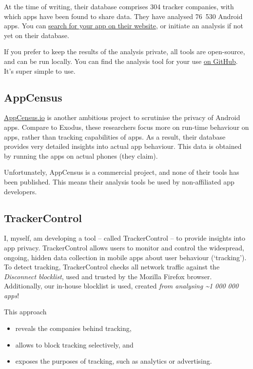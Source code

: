 \documentclass[
]{book}
\providecommand{\tightlist}{%
  \setlength{\itemsep}{0pt}\setlength{\parskip}{0pt}}
\begin{document}
At the time of writing, their database comprises 304 tracker companies, with which apps have been found to share data. They have analysed 76~530 Android apps. You can \href{https://reports.exodus-privacy.eu.org/en/reports/}{search for your app on their website}, or initiate an analysis if not yet on their database.

If you prefer to keep the results of the analysis private, all tools are open-source, and can be run locally. You can find the analysis tool for your use \href{https://github.com/Exodus-Privacy/exodus-standalone}{on GitHub}. It's super simple to use.

\hypertarget{appcensus}{%
\subsection{AppCensus}\label{appcensus}}

\href{https://search.appcensus.io/}{AppCensus.io} is another ambitious project to scrutinise the privacy of Android apps. Compare to Exodus, these researchers focus more on run-time behaviour on apps, rather than tracking capabilities of apps. As a result, their database provides very detailed insights into actual app behaviour. This data is obtained by running the apps on actual phones (they claim).

Unfortunately, AppCensus is a commercial project, and none of their tools has been published. This means their analysis tools be used by non-affiliated app developers.

\hypertarget{trackercontrol}{%
\subsection{TrackerControl}\label{trackercontrol}}

I, myself, am developing a tool -- called TrackerControl -- to provide insights into app privacy. TrackerControl allows users to monitor and control the widespread, ongoing, hidden data collection in mobile apps about user behaviour (`tracking'). To detect tracking, TrackerControl checks all network traffic against the \emph{Disconnect blocklist}, used and trusted by the Mozilla Firefox browser. Additionally, our in-house blocklist is used, created \emph{from analysing \textasciitilde1 000 000 apps}!

This approach

\begin{itemize}
\tightlist
\item
  reveals the companies behind tracking,
\item
  allows to block tracking selectively, and
\item
  exposes the purposes of tracking, such as analytics or advertising.
\end{itemize}
\end{document}
